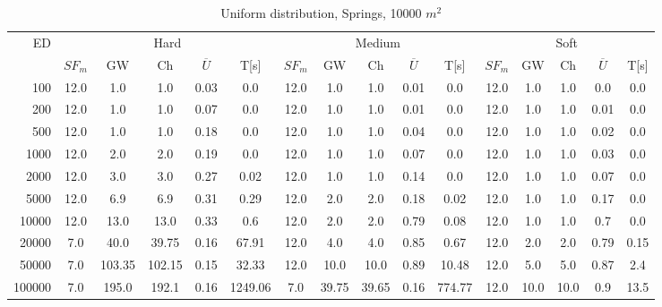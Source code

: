 \begin{table}[htb]
	\centering
	\begin{tabular}{|r|c|c|c|c|c|c|c|c|c|c|c|c|c|c|c|} 
		\hline
		\multirow{2}{*}{ED} & \multicolumn{5}{c|}{Hard} & \multicolumn{5}{c|}{Medium} &\multicolumn{5}{c|}{Soft} \\ 
		\cline{2-16} 
		&$SF_{m}$&GW & Ch & $\overline{U}$&T[s] &$SF_{m}$&GW & Ch & $\overline{U}$ &T[s] &$SF_{m}$&GW & Ch & $\overline{U}$  & T[s]  \\ 
		\hline 
		100 & 12.0 & 1.0 & 1.0 & 0.03 & 0.0 & 12.0 & 1.0 & 1.0 & 0.01 & 0.0 & 12.0 & 1.0 & 1.0 & 0.0 & 0.0\\ 
		200 & 12.0 & 1.0 & 1.0 & 0.07 & 0.0 & 12.0 & 1.0 & 1.0 & 0.01 & 0.0 & 12.0 & 1.0 & 1.0 & 0.01 & 0.0\\ 
		500 & 12.0 & 1.0 & 1.0 & 0.18 & 0.0 & 12.0 & 1.0 & 1.0 & 0.04 & 0.0 & 12.0 & 1.0 & 1.0 & 0.02 & 0.0\\ 
		1000 & 12.0 & 2.0 & 2.0 & 0.19 & 0.0 & 12.0 & 1.0 & 1.0 & 0.07 & 0.0 & 12.0 & 1.0 & 1.0 & 0.03 & 0.0\\ 
		2000 & 12.0 & 3.0 & 3.0 & 0.27 & 0.02 & 12.0 & 1.0 & 1.0 & 0.14 & 0.0 & 12.0 & 1.0 & 1.0 & 0.07 & 0.0\\ 
		5000 & 12.0 & 6.9 & 6.9 & 0.31 & 0.29 & 12.0 & 2.0 & 2.0 & 0.18 & 0.02 & 12.0 & 1.0 & 1.0 & 0.17 & 0.0\\ 
		10000 & 12.0 & 13.0 & 13.0 & 0.33 & 0.6 & 12.0 & 2.0 & 2.0 & 0.79 & 0.08 & 12.0 & 1.0 & 1.0 & 0.7 & 0.0\\ 
		20000 & 7.0 & 40.0 & 39.75 & 0.16 & 67.91 & 12.0 & 4.0 & 4.0 & 0.85 & 0.67 & 12.0 & 2.0 & 2.0 & 0.79 & 0.15\\ 
		50000 & 7.0 & 103.35 & 102.15 & 0.15 & 32.33 & 12.0 & 10.0 & 10.0 & 0.89 & 10.48 & 12.0 & 5.0 & 5.0 & 0.87 & 2.4\\ 
		100000 & 7.0 & 195.0 & 192.1 & 0.16 & 1249.06 & 7.0 & 39.75 & 39.65 & 0.16 & 774.77 & 12.0 & 10.0 & 10.0 & 0.9 & 13.5\\ 
		\hline 
	\end{tabular} 
	\caption{Uniform distribution, Springs, 10000 $m^2$} 
	\label{tab:UnSprings100} 
\end{table} 
